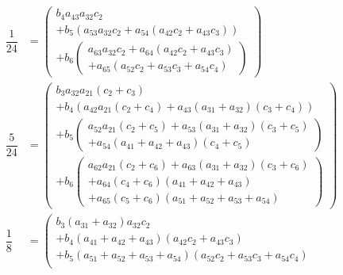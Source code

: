 \documentclass[a4paper,oneside]{book}
\numberwithin{equation}{chapter}
\begin{document}
\begin{align}
\dfrac{1}{{24}} &= \left( \begin{array}{l}
{b_4}{a_{43}}{a_{32}}{c_2}\\
 + {b_5}\left( {{a_{53}}{a_{32}}{c_2} + {a_{54}}\left( {{a_{42}}{c_2} + {a_{43}}{c_3}} \right)} \right)\\
 + {b_6}\left( \begin{array}{l}
{a_{63}}{a_{32}}{c_2} + {a_{64}}\left( {{a_{42}}{c_2} + {a_{43}}{c_3}} \right)\\
 + {a_{65}}\left( {{a_{52}}{c_2} + {a_{53}}{c_3} + {a_{54}}{c_4}} \right)
\end{array} \right)
\end{array} \right)\\
\dfrac{5}{{24}} &= \left( \begin{array}{l}
{b_3}{a_{32}}{a_{21}}\left( {{c_2} + {c_3}} \right)\\
 + {b_4}\left( {{a_{42}}{a_{21}}\left( {{c_2} + {c_4}} \right) + {a_{43}}\left( {{a_{31}} + {a_{32}}} \right)\left( {{c_3} + {c_4}} \right)} \right)\\
 + {b_5}\left( \begin{array}{l}
{a_{52}}{a_{21}}\left( {{c_2} + {c_5}} \right) + {a_{53}}\left( {{a_{31}} + {a_{32}}} \right)\left( {{c_3} + {c_5}} \right)\\
 + {a_{54}}\left( {{a_{41}} + {a_{42}} + {a_{43}}} \right)\left( {{c_4} + {c_5}} \right)
\end{array} \right)\\
 + {b_6}\left( \begin{array}{l}
{a_{62}}{a_{21}}\left( {{c_2} + {c_6}} \right) + {a_{63}}\left( {{a_{31}} + {a_{32}}} \right)\left( {{c_3} + {c_6}} \right)\\
 + {a_{64}}\left( {{c_4} + {c_6}} \right)\left( {{a_{41}} + {a_{42}} + {a_{43}}} \right)\\
 + {a_{65}}\left( {{c_5} + {c_6}} \right)\left( {{a_{51}} + {a_{52}} + {a_{53}} + {a_{54}}} \right)
\end{array} \right)
\end{array} \right)\\
\dfrac{1}{8} &= \left( \begin{array}{l}
{b_3}\left( {{a_{31}} + {a_{32}}} \right){a_{32}}{c_2}\\
 + {b_4}\left( {{a_{41}} + {a_{42}} + {a_{43}}} \right)\left( {{a_{42}}{c_2} + {a_{43}}{c_3}} \right)\\
 + {b_5}\left( {{a_{51}} + {a_{52}} + {a_{53}} + {a_{54}}} \right)\left( {{a_{52}}{c_2} + {a_{53}}{c_3} + {a_{54}}{c_4}} \right)\\

\end{array}
\end{align}
\end{document}
